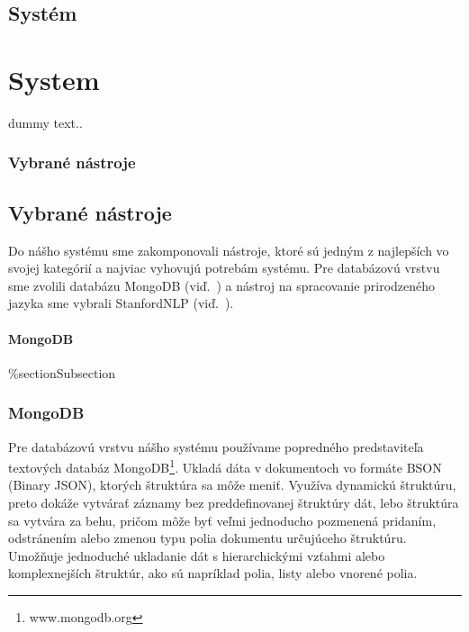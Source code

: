 \newpage
%
%
{
	\section{Systém}
}
{
	\chapter{System}
}
\label{section:implementation}
dummy text..

%
%
{
	\subsection{Vybrané nástroje}
}
{
	\section{Vybrané nástroje}
}
\label{system:tools_chosen}
Do nášho systému sme zakomponovali nástroje, ktoré sú jedným z najlepších vo svojej kategórií a najviac vyhovujú potrebám systému. Pre databázovú vrstvu sme zvolili databázu MongoDB (viď.~) a nástroj na spracovanie prirodzeného jazyka sme vybrali StanfordNLP (viď.~).

%
%
{
	\subsubsection{MongoDB}
}
{
	\%section{Subsection}
	\subsection{MongoDB}
}
\label{system:mongodb}
Pre databázovú vrstvu nášho systému používame popredného predstaviteľa textových databáz MongoDB\footnote{www.mongodb.org}. Ukladá dáta v dokumentoch vo formáte BSON (Binary JSON), ktorých štruktúra sa môže meniť. Využíva dynamickú štruktúru, preto dokáže vytvárať záznamy bez preddefinovanej štruktúry dát, lebo štruktúra sa vytvára za behu, pričom môže byť veľmi jednoducho pozmenená pridaním, odstránením alebo zmenou typu polia dokumentu určujúceho štruktúru. Umožňuje jednoduché ukladanie dát s hierarchickými vzťahmi alebo komplexnejších štruktúr, ako sú napríklad polia, listy alebo vnorené polia.

